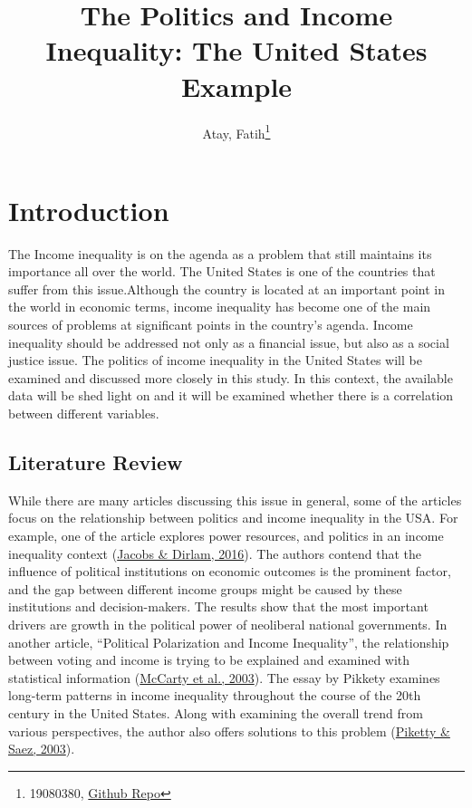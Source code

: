 \documentclass[
  12pt,
]{article}
\title{The Politics and Income Inequality: The United States Example}
\author{Atay, Fatih\footnote{19080380, \href{https://github.com/atayfatih/midterm}{Github Repo}}}
\date{}
\begin{document}
\maketitle

\hypertarget{introduction}{%
\section{Introduction}\label{introduction}}

The Income inequality is on the agenda as a problem that still maintains its importance all over the world. The United States is one of the countries that suffer from this issue.Although the country is located at an important point in the world in economic terms, income inequality has become one of the main sources of problems at significant points in the country's agenda. Income inequality should be addressed not only as a financial issue, but also as a social justice issue. The politics of income inequality in the United States will be examined and discussed more closely in this study. In this context, the available data will be shed light on and it will be examined whether there is a correlation between different variables.

\hypertarget{literature-review}{%
\subsection{Literature Review}\label{literature-review}}

While there are many articles discussing this issue in general, some of the articles focus on the relationship between politics and income inequality in the USA. For example, one of the article explores power resources, and politics in an income inequality context (\protect\hyperlink{ref-jacobs2016politics}{Jacobs \& Dirlam, 2016}). The authors contend that the influence of political institutions on economic outcomes is the prominent factor, and the gap between different income groups might be caused by these institutions and decision-makers. The results show that the most important drivers are growth in the political power of neoliberal national governments. In another article, ``Political Polarization and Income Inequality'', the relationship between voting and income is trying to be explained and examined with statistical information (\protect\hyperlink{ref-mccarty2003political}{McCarty et al., 2003}). The essay by Pikkety examines long-term patterns in income inequality throughout the course of the 20th century in the United States. Along with examining the overall trend from various perspectives, the author also offers solutions to this problem (\protect\hyperlink{ref-piketty2003income}{Piketty \& Saez, 2003}).
\end{document}
